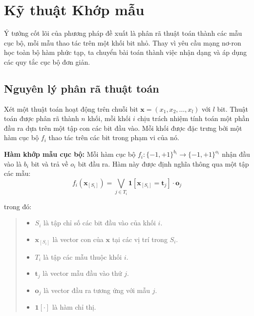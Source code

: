\section{Kỹ thuật Khớp mẫu}

Ý tưởng cốt lõi của phương pháp đề xuất là phân rã thuật toán thành các mẫu cục bộ, mỗi mẫu thao tác trên một khối bit nhỏ. Thay vì yêu cầu mạng nơ-ron học toàn bộ hàm phức tạp, ta chuyển bài toán thành việc nhận dạng và áp dụng các quy tắc cục bộ đơn giản.

\subsection{Nguyên lý phân rã thuật toán}

Xét một thuật toán hoạt động trên chuỗi bit $\mathbf{x} = (x_1, x_2, \ldots, x_l)$ với $l$ bit. Thuật toán được phân rã thành $n$ khối, mỗi khối $i$ chịu trách nhiệm tính toán một phần đầu ra dựa trên một tập con các bit đầu vào. Mỗi khối được đặc trưng bởi một hàm cục bộ $f_i$ thao tác trên các bit trong phạm vi của nó.

\vspace{0.2cm}

\textbf{Hàm khớp mẫu cục bộ:} Mỗi hàm cục bộ $f_i: \{-1, +1\}^{b_i} \rightarrow \{-1, +1\}^{o_i}$ nhận đầu vào là $b_i$ bit và trả về $o_i$ bit đầu ra. Hàm này được định nghĩa thông qua một tập các mẫu:
\begin{equation}
    f_i(\mathbf{x}_{[S_i]}) = \bigvee_{j \in T_i} \mathbf{1}[\mathbf{x}_{[S_i]} = \mathbf{t}_j] \cdot \mathbf{o}_j
\end{equation}

trong đó:
\begin{quote}
\begin{itemize}
    \item $S_i$ là tập chỉ số các bit đầu vào của khối $i$.
    \item $\mathbf{x}_{[S_i]}$ là vector con của $\mathbf{x}$ tại các vị trí trong $S_i$.
    \item $T_i$ là tập các mẫu thuộc khối $i$.
    \item $\mathbf{t}_j$ là vector mẫu đầu vào thứ $j$.
    \item $\mathbf{o}_j$ là vector đầu ra tương ứng với mẫu $j$.
    \item $\mathbf{1}[\cdot]$ là hàm chỉ thị.
\end{itemize}
\end{quote}

\vspace{0.2cm}

